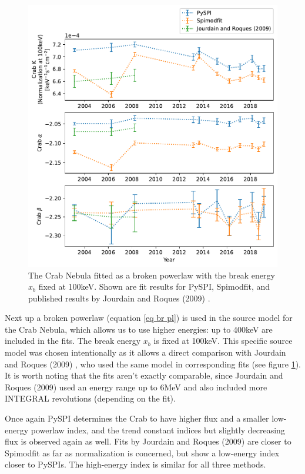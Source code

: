 \documentclass{report}
\begin{document}
\begin{figure}[H]
  \centering
  \includegraphics[width=.75\textwidth]{Images/Crab_Fits/crab_brk_pl_100.pdf}
  \caption{The Crab Nebula fitted as a broken powerlaw with the break energy $x_b$ fixed at 100keV. Shown are fit results for PySPI, Spimodfit, and published results by Jourdain and Roques (2009) \cite{2009ApJ...704...17J}.}
  \label{fig crab br pl}
\end{figure}

Next up a broken powerlaw (equation \ref{eq br pl}) is used in the source model for the Crab Nebula, which allows us to use higher energies: up to 400keV are included in the fits. The break energy $x_b$ is fixed at 100keV. This specific source model was chosen intentionally as it allows a direct comparison with Jourdain and Roques (2009) \cite{2009ApJ...704...17J}, who used the same model in corresponding fits (see figure \ref{fig crab br pl}). It is worth noting that the fits aren't exactly comparable, since  Jourdain and Roques (2009) \cite{2009ApJ...704...17J} used an energy range up to 6MeV and also included more INTEGRAL revolutions (depending on the fit).

Once again PySPI determines the Crab to have higher flux and a smaller low-energy powerlaw index, and the trend constant indices but slightly decreasing flux is observed again as well. Fits by Jourdain and Roques (2009) \cite{2009ApJ...704...17J} are closer to Spimodfit as far as normalization is concerned, but show a low-energy index closer to PySPIs. The high-energy index is similar for all three methods.
\end{document}
